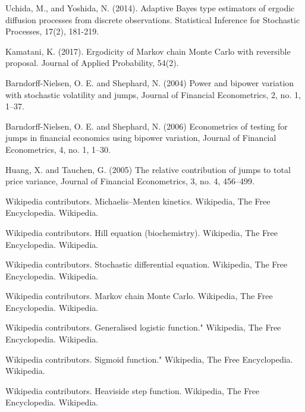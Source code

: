 \begin{thebibliography}{00}
Uchida, M., and Yoshida, N. (2014). 
\newblock Adaptive Bayes type estimators of ergodic diffusion processes from discrete observations. 
\newblock Statistical Inference for Stochastic Processes, 17(2), 181-219.

Kamatani, K. (2017).
\newblock Ergodicity of Markov chain Monte Carlo with reversible proposal. 
\newblock Journal of Applied Probability, 54(2).
	
Barndorff-Nielsen, O. E. and Shephard, N. (2004) 
\newblock Power and bipower variation with stochastic volatility and jumps, 
\newblock Journal of Financial Econometrics, 2, no. 1, 1–37.
	
Barndorff-Nielsen, O. E. and Shephard, N. (2006) 
\newblock Econometrics of testing for jumps in financial economics using bipower variation, 
\newblock Journal of Financial Econometrics, 4, no. 1, 1–30.
	
Huang, X. and Tauchen, G. (2005) 
\newblock The relative contribution of jumps to total price variance, 
\newblock Journal of Financial Econometrics, 3, no. 4, 456–499.

Wikipedia contributors. 
\newblock Michaelis–Menten kinetics. 
\newblock Wikipedia, The Free Encyclopedia. Wikipedia.

Wikipedia contributors. 
\newblock Hill equation (biochemistry).
\newblock Wikipedia, The Free Encyclopedia. Wikipedia. 

Wikipedia contributors. 
\newblock Stochastic differential equation.
\newblock Wikipedia, The Free Encyclopedia. Wikipedia.

Wikipedia contributors. 
\newblock Markov chain Monte Carlo.
\newblock Wikipedia, The Free Encyclopedia. Wikipedia.

Wikipedia contributors. 
\newblock Generalised logistic function." 
\newblock Wikipedia, The Free Encyclopedia. Wikipedia. 

Wikipedia contributors. 
\newblock Sigmoid function." 
\newblock Wikipedia, The Free Encyclopedia. Wikipedia. 

Wikipedia contributors. 
\newblock Heaviside step function.
\newblock Wikipedia, The Free Encyclopedia. Wikipedia.
\end{thebibliography}


